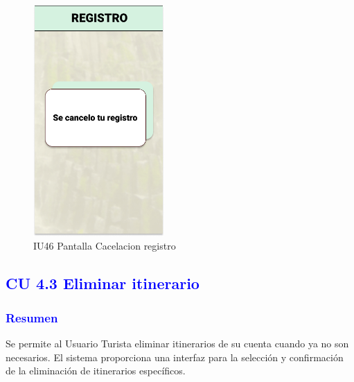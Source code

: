 \begin{figure}[htbp]
        \centering
        \includegraphics[width= 5cm]{Pantallas Prototipo3/IU46 Pantalla Cacelacion registro.jpg}
        \caption{IU46 Pantalla Cacelacion registro}
        \label{fig:enter-label}
        \vspace{200pt}
\end{figure}

\newpage
             




\subsection{\textcolor{blue}{CU 4.3 Eliminar itinerario}}
\subsubsection{\textcolor{blue}{Resumen}}
Se permite al Usuario Turista eliminar itinerarios de su cuenta cuando ya no son necesarios. El sistema proporciona una interfaz para la selección y confirmación de la eliminación de itinerarios
específicos.

